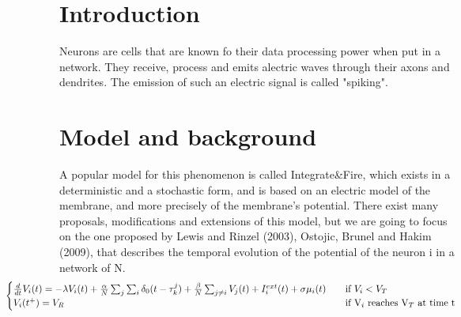 \documentclass{report}
\begin{document}
\section{Introduction}
	Neurons are cells that are known fo their data processing power when put in a network. They receive, process and emits alectric waves through their axons and dendrites. The emission of such an electric signal is called "spiking".\\
\section{Model and background}
	A popular model for this phenomenon is called Integrate\&Fire, which exists in a deterministic and a stochastic form, and is based on an electric model of the membrane, and more precisely of the membrane's potential. There exist many proposals, modifications and extensions of this model, but we are going to focus on the one proposed by Lewis and Rinzel (2003), Ostojic, Brunel and Hakim (2009), that describes the temporal evolution of the potential of the neuron i in a network of N.\\

	\begin{equation}
		\hspace*{-2cm} \begin{cases}
			\frac{d}{dt}V_i(t)=-\lambda V_i(t)+\frac{\alpha}{N}\sum_j\sum_i\delta_0(t-\tau_k^j)+\frac{\beta}{N}\sum_{j\neq i}V_j(t)+I_i^{ext}(t)+\sigma\mu_i(t) &\quad\text{if }V_i<V_T\\
			V_i(t^+)=V_R & \quad\text{if V}_i\text{ reaches V}_T\text{ at time t}\\
		\end{cases}
	\end{equation}
\end{document}
